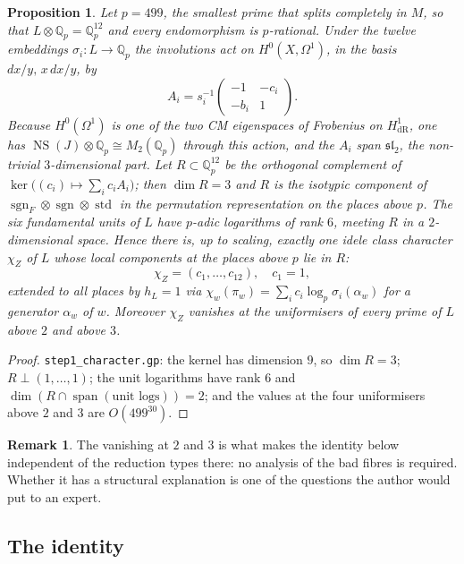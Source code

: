 \documentclass[11pt,reqno]{amsart}
\theoremstyle{plain}
\newtheorem{proposition}[theorem]{Proposition}
\theoremstyle{definition}
\newtheorem{remark}[theorem]{Remark}
\newcommand{\Q}{\mathbb{Q}}
\DeclareMathOperator{\NS}{NS}
\DeclareMathOperator{\sgn}{sgn}
\DeclareMathOperator{\stdrep}{std}
\numberwithin{equation}{section}
\begin{document}
\begin{proposition}\label{prop:character}
Let $p=499$, the smallest prime that splits completely in $M$, so that
$L\otimes\Q_{p}=\Q_{p}^{12}$ and every endomorphism is $p$-rational. Under the
twelve embeddings $\sigma_{i}\colon L\to\Q_{p}$ the involutions act on
$H^{0}(X,\Omega^{1})$, in the basis $dx/y,\,x\,dx/y$, by
\[
  A_{i}=s_{i}^{-1}\begin{pmatrix}-1&-c_{i}\\-b_{i}&1\end{pmatrix}.
\]
Because $H^{0}(\Omega^{1})$ is one of the two CM eigenspaces of Frobenius on
$H^{1}_{\mathrm{dR}}$, one has $\NS(J)\otimes\Q_{p}\cong M_{2}(\Q_{p})$ through
this action, and the $A_{i}$ span $\mathfrak{sl}_{2}$, the non-trivial
$3$-dimensional part. Let $R\subset\Q_{p}^{12}$ be the orthogonal complement of
$\ker\bigl((c_{i})\mapsto\sum_{i}c_{i}A_{i}\bigr)$; then $\dim R=3$ and $R$ is
the isotypic component of $\sgn_{F}\otimes\sgn\otimes\stdrep$ in the permutation
representation on the places above $p$. The six fundamental units of $L$ have
$p$-adic logarithms of rank $6$, meeting $R$ in a $2$-dimensional space. Hence
there is, up to scaling, exactly one idele class character $\chi_{Z}$ of $L$
whose local components at the places above $p$ lie in $R$:
\[
  \chi_{Z}=(c_{1},\dots,c_{12}),\quad c_{1}=1,
\]
extended to all places by $h_{L}=1$ via
$\chi_{w}(\pi_{w})=\sum_{i}c_{i}\log_{p}\sigma_{i}(\alpha_{w})$ for a generator
$\alpha_{w}$ of $w$. Moreover $\chi_{Z}$ vanishes at the uniformisers of every
prime of $L$ above $2$ and above $3$.
\end{proposition}

\begin{proof}
\texttt{step1\_character.gp}: the kernel has dimension $9$, so $\dim R=3$;
$R\perp(1,\dots,1)$; the unit logarithms have rank $6$ and
$\dim(R\cap\operatorname{span}(\text{unit logs}))=2$; and the values at the four
uniformisers above $2$ and $3$ are $O(499^{30})$.
\end{proof}

\begin{remark}
The vanishing at $2$ and $3$ is what makes the identity below independent of the
reduction types there: no analysis of the bad fibres is required. Whether it has
a structural explanation is one of the questions the author would put to an
expert.
\end{remark}

\subsection{The identity}
\end{document}
